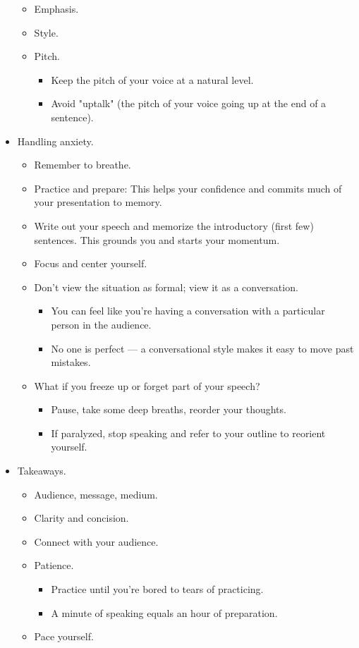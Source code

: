 \documentclass[../notes.tex]{subfiles}
\begin{document}
\begin{itemize}
\begin{itemize}
        \item Emphasis.
        \item Style.
        \item Pitch.
        \begin{itemize}
            \item Keep the pitch of your voice at a natural level.
            \item Avoid "uptalk" (the pitch of your voice going up at the end of a sentence).
        \end{itemize}
    \end{itemize}
    \item Handling anxiety.
    \begin{itemize}
        \item Remember to breathe.
        \item Practice and prepare: This helps your confidence and commits much of your presentation to memory.
        \item Write out your speech and memorize the introductory (first few) sentences. This grounds you and starts your momentum.
        \item Focus and center yourself.
        \item Don't view the situation as formal; view it as a conversation.
        \begin{itemize}
            \item You can feel like you're having a conversation with a particular person in the audience.
            \item No one is perfect --- a conversational style makes it easy to move past mistakes.
        \end{itemize}
        \item What if you freeze up or forget part of your speech?
        \begin{itemize}
            \item Pause, take some deep breaths, reorder your thoughts.
            \item If paralyzed, stop speaking and refer to your outline to reorient yourself.
        \end{itemize}
    \end{itemize}
    \item Takeaways.
    \begin{itemize}
        \item Audience, message, medium.
        \item Clarity and concision.
        \item Connect with your audience.
        \item Patience.
        \begin{itemize}
            \item Practice until you're bored to tears of practicing.
            \item A minute of speaking equals an hour of preparation.
        \end{itemize}
        \item Pace yourself.
    \end{itemize}
\end{itemize}
\end{document}
